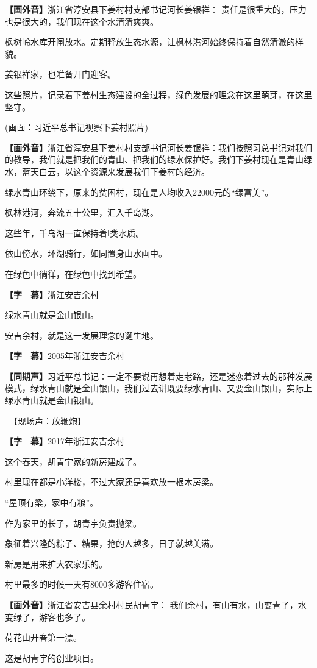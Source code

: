 \documentclass{ctexart}
\newcommand{\zkh}[1]{\textbf{\hspace{-2.7em} 【#1】}}
\begin{document}
 \zkh{画外音}浙江省淳安县下姜村村支部书记河长姜银祥： 责任是很重大的，压力也是很大的，我们现在这个水清清爽爽。

 
枫树岭水库开闸放水。定期释放生态水源，让枫林港河始终保持着自然清澈的样貌。

 姜银祥家，也准备开门迎客。

这些照片，记录着下姜村生态建设的全过程，绿色发展的理念在这里萌芽，在这里坚守。

 (画面：习近平总书记视察下姜村照片)

 \zkh{画外音}浙江省淳安县下姜村村支部书记河长姜银祥：我们按照习总书记对我们的教导，我们就是把我们的青山、把我们的绿水保护好。我们下姜村现在是青山绿水，蓝天白云，以这个资源来发展我们下姜村的经济。

 
绿水青山环绕下，原来的贫困村，现在是人均收入22000元的``绿富美''。

 枫林港河，奔流五十公里，汇入千岛湖。

 这些年，千岛湖一直保持着Ⅰ类水质。

 依山傍水，环湖骑行，如同置身山水画中。

 在绿色中徜徉，在绿色中找到希望。

 \zkh{字　幕}浙江安吉余村

 绿水青山就是金山银山。

 安吉余村，就是这一发展理念的诞生地。

 \zkh{字　幕}2005年浙江安吉余村

 \zkh{同期声}习近平总书记：一定不要说再想着走老路，还是迷恋着过去的那种发展模式，绿水青山就是金山银山，我们过去讲既要绿水青山、又要金山银山，实际上绿水青山就是金山银山。

 　【现场声：放鞭炮】 
 
 \zkh{字　幕}2017年浙江安吉余村

 这个春天，胡青宇家的新房建成了。

 村里现在都是小洋楼，不过大家还是喜欢放一根木房梁。

 ``屋顶有梁，家中有粮''。

 作为家里的长子，胡青宇负责抛梁。

 象征着兴隆的粽子、糖果，抢的人越多，日子就越美满。

 新房是用来扩大农家乐的。

 村里最多的时候一天有8000多游客住宿。

 \zkh{画外音}浙江省安吉县余村村民胡青宇： 我们余村，有山有水，山变青了，水变绿了，游客也多了。

 荷花山开春第一漂。

 这是胡青宇的创业项目。
\end{document}
